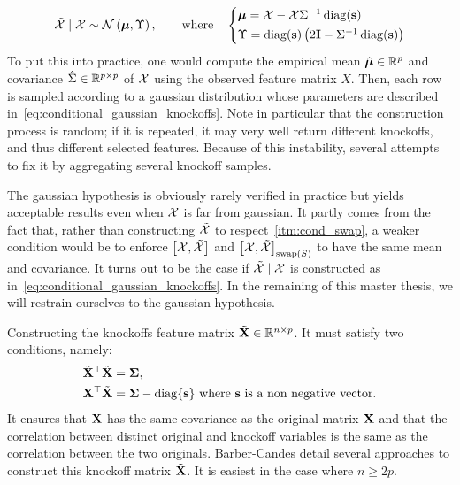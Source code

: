 \begin{equation}\label{eq:conditional_gaussian_knockoffs}
        \tcX \mid \cX \sim \cN\left( \bmu, \Upsilon \right)
        ,\qquad\text{where}\quad
        \begin{cases*}
                \bmu = \cX - \cX\Sigma^{-1}\diag(\bs)\\
                \Upsilon = \diag(\bs)\left( 2\mI - \Sigma^{-1}\diag(\bs) \right)
        \end{cases*}
\end{equation}
To put this into practice, one would compute the empirical mean
$\hat{\bm{\mu}} \in \mathbb{R}^p$ and covariance $\hat{\Sigma} \in \mathbb{R}^{p \times p}$ of $\mathcal{X}$
using the observed feature matrix $X$.
Then, each row is sampled according to a gaussian distribution whose parameters are described
in~\ref{eq:conditional_gaussian_knockoffs}.
Note in particular that the construction process is random;
if it is repeated, it may very well return different knockoffs, and thus different
selected features.
Because of this instability, several attempts~\cite{improve_stability_knockoffs} to fix it by
aggregating several knockoff samples.

The gaussian hypothesis is obviously rarely verified in practice but yields acceptable results even when
$\mathcal{X}$ is far from gaussian.
It partly comes from the fact that, rather than constructing $\tilde{\mathcal{X}}$ to respect~\ref{itm:cond_swap},
a weaker condition would be to enforce $\big[ \mathcal{X}, \tilde{\mathcal{X}} \big]$ and $\big[ \mathcal{X}, \tilde{\mathcal{X}} \big]_{\operatorname{swap}(S)}$ to have the
same mean and covariance.
It turns out to be the case if $\tilde{\mathcal{X}} \mid \mathcal{X}$ is constructed as in~\ref{eq:conditional_gaussian_knockoffs}.
In the remaining of this master thesis, we will restrain ourselves to the gaussian hypothesis.

Constructing the knockoffs feature matrix $\tilde{\mathbf{X}} \in \mathbb{R}^{n \times p}$.
It must satisfy two conditions, namely:
\begin{align*}
        &{\tilde{\mathbf{X}}}^\top\tilde{\mathbf{X}} = \bm{\Sigma},
        \\
        &\mathbf{X}^\top\tilde{\mathbf{X}} = \bm{\Sigma} - \operatorname*{diag}\{\mathbf{s}\}
        \text{ where } \mathbf{s} \text{ is a non negative vector.}
\end{align*}
It ensures that $\tilde{\mathbf{X}}$ has the same covariance as the original matrix $\mathbf{X}$
and that the correlation between distinct original and knockoff variables is the same as the correlation between the
two originals.
Barber-Candes detail several approaches to construct this knockoff matrix $\tilde{\mathbf{X}}$.
It is easiest in the case where $n \geq 2p$.

